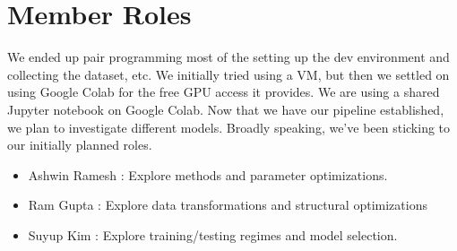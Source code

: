 \section{Member Roles}
We ended up pair programming most of the setting up the dev environment and collecting the dataset, etc. We initially tried using a VM, but then we settled on using Google Colab for the free GPU access it provides. We are using a shared Jupyter notebook on Google Colab. Now that we have our pipeline established, we plan to investigate different models.
Broadly speaking, we've been sticking to our initially planned roles. 
\begin{itemize}
    \item Ashwin Ramesh : Explore methods and parameter optimizations. 
    \item Ram Gupta : Explore data transformations and structural optimizations
    \item Suyup Kim : Explore training/testing regimes and model selection. 
\end{itemize}